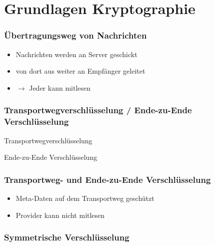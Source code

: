\section{Grundlagen Kryptographie}


\begin{frame}
  \frametitle{Übertragungsweg von Nachrichten}
  \center {}
  \begin{itemize}
    \item Nachrichten werden an Server geschickt
    \item von dort aus weiter an Empfänger geleitet
    \item $\rightarrow$ Jeder kann mitlesen
  \end{itemize}

\end{frame}

\begin{frame}
  \frametitle{Transportwegverschlüsselung / Ende-zu-Ende Verschlüsselung}
  Transportwegverschlüsselung
  \begin{center}
  \end{center}


  Ende-zu-Ende Verschlüsselung
  \center {}
\end{frame}

\begin{frame}
  \frametitle{Transportweg- und Ende-zu-Ende Verschlüsselung}
  \begin{center}
  \end{center}
  \begin{itemize}
    \item Meta-Daten auf dem Transportweg geschützt
    \item Provider kann nicht mitlesen
  \end{itemize}
\end{frame}


\begin{frame}
  \frametitle{Symmetrische Verschlüsselung}
  \center {}
\end{frame}

